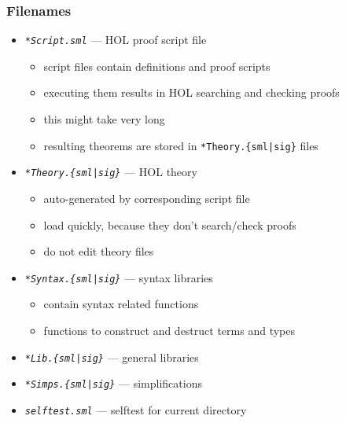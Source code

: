 \begin{frame}
\frametitle{Filenames}
\begin{itemize}
\item \emph{\texttt{*Script.sml}} --- HOL proof script file 
\begin{itemize}
\item script files contain definitions and proof scripts
\item executing them results in HOL searching and checking proofs
\item this might take very long
\item resulting theorems are stored in \texttt{*Theory.\{sml|sig\}} files
\end{itemize}
\item \emph{\texttt{*Theory.\{sml|sig\}}} --- HOL theory\\
\begin{itemize}
\item auto-generated by corresponding script file
\item load quickly, because they don't search/check proofs
\item do not edit theory files
\end{itemize}
\item \emph{\texttt{*Syntax.\{sml|sig\}}} --- syntax libraries \\
\begin{itemize}
\item contain syntax related functions 
\item \ie functions to construct and destruct terms and types
\end{itemize}
\item \emph{\texttt{*Lib.\{sml|sig\}}} --- general libraries
\item \emph{\texttt{*Simps.\{sml|sig\}}} --- simplifications
\item \emph{\texttt{selftest.sml}} --- selftest for current directory
\end{itemize}
\end{frame}



